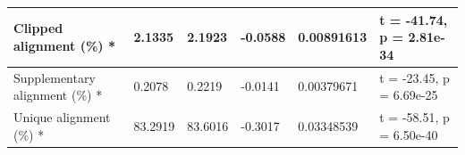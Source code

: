 \documentclass[../main.tex]{subfiles}
\begin{document}
\begin{flushleft}
\begin{landscape}
\begin{table}
\begin{tabular}{|l|l|l|l|l|l|}
            \hline
            Clipped alignment (\%) *       & 2.1335                      & 2.1923              & -0.0588             & 0.00891613     & t = -41.74, p = 2.81e-34         \\
            \hline
            Supplementary alignment (\%) * & 0.2078                      & 0.2219              & -0.0141             & 0.00379671     & t = -23.45, p = 6.69e-25         \\
            \hline
            Unique alignment (\%) *        & 83.2919                     & 83.6016             & -0.3017             & 0.03348539     & t = -58.51, p = 6.50e-40         \\
            \hline
            \end{tabular}
    \end{table}

\end{landscape}

\newpage



\end{flushleft}
\end{document}
